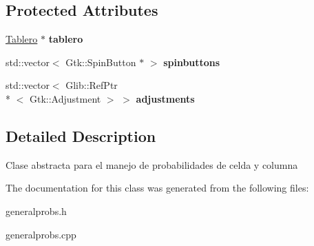 \subsection*{Protected Attributes}
\begin{DoxyCompactItemize}
\item 
\hypertarget{classProbs_ac5d2405551d7aaa74920356b09e1de1e}{\hyperlink{classTablero}{Tablero} $\ast$ {\bfseries tablero}}\label{classProbs_ac5d2405551d7aaa74920356b09e1de1e}

\item 
\hypertarget{classProbs_a9a02b4a3aee0e9bc42ed626b232de5d3}{std\-::vector$<$ Gtk\-::\-Spin\-Button $\ast$ $>$ {\bfseries spinbuttons}}\label{classProbs_a9a02b4a3aee0e9bc42ed626b232de5d3}

\item 
\hypertarget{classProbs_ae5a188ea47bbe0160cc80a3ba3fda2a7}{std\-::vector$<$ Glib\-::\-Ref\-Ptr\\*
$<$ Gtk\-::\-Adjustment $>$ $>$ {\bfseries adjustments}}\label{classProbs_ae5a188ea47bbe0160cc80a3ba3fda2a7}

\end{DoxyCompactItemize}


\subsection{Detailed Description}
Clase abstracta para el manejo de probabilidades de celda y columna 

The documentation for this class was generated from the following files\-:\begin{DoxyCompactItemize}
\item 
generalprobs.\-h\item 
generalprobs.\-cpp\end{DoxyCompactItemize}
